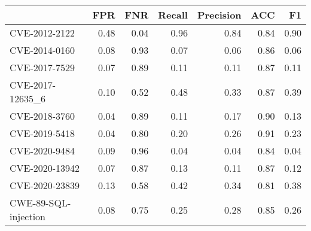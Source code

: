 \begin{tabular}{lrrrrrr}
\toprule
{} &  FPR &  FNR &  Recall &  Precision &  ACC &   F1 \\
\midrule
CVE-2012-2122        & 0.48 & 0.04 &    0.96 &       0.84 & 0.84 & 0.90 \\
CVE-2014-0160        & 0.08 & 0.93 &    0.07 &       0.06 & 0.86 & 0.06 \\
CVE-2017-7529        & 0.07 & 0.89 &    0.11 &       0.11 & 0.87 & 0.11 \\
CVE-2017-12635\_6     & 0.10 & 0.52 &    0.48 &       0.33 & 0.87 & 0.39 \\
CVE-2018-3760        & 0.04 & 0.89 &    0.11 &       0.17 & 0.90 & 0.13 \\
CVE-2019-5418        & 0.04 & 0.80 &    0.20 &       0.26 & 0.91 & 0.23 \\
CVE-2020-9484        & 0.09 & 0.96 &    0.04 &       0.04 & 0.84 & 0.04 \\
CVE-2020-13942       & 0.07 & 0.87 &    0.13 &       0.11 & 0.87 & 0.12 \\
CVE-2020-23839       & 0.13 & 0.58 &    0.42 &       0.34 & 0.81 & 0.38 \\
CWE-89-SQL-injection & 0.08 & 0.75 &    0.25 &       0.28 & 0.85 & 0.26 \\
\bottomrule
\end{tabular}
